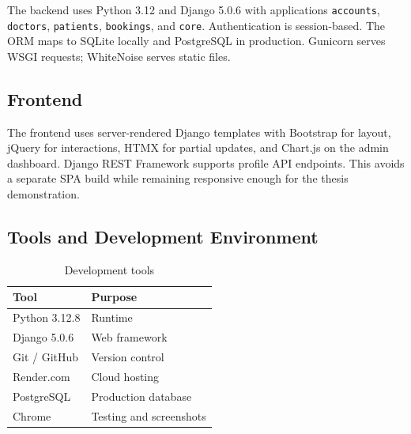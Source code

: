 The backend uses Python 3.12 and Django 5.0.6 with applications \texttt{accounts}, \texttt{doctors}, \texttt{patients}, \texttt{bookings}, and \texttt{core}. Authentication is session-based. The ORM maps to SQLite locally and PostgreSQL in production. Gunicorn serves WSGI requests; WhiteNoise serves static files.

\subsection{Frontend}

The frontend uses server-rendered Django templates with Bootstrap for layout, jQuery for interactions, HTMX for partial updates, and Chart.js on the admin dashboard. Django REST Framework supports profile API endpoints. This avoids a separate SPA build while remaining responsive enough for the thesis demonstration.

\subsection{Tools and Development Environment}

\begin{table}[htbp]
  \centering
  \caption{Development tools}
  \begin{tabular}{@{}ll@{}}
    \toprule
    Tool & Purpose \\
    \midrule
    Python 3.12.8 & Runtime \\
    Django 5.0.6 & Web framework \\
    Git / GitHub & Version control \\
    Render.com & Cloud hosting \\
    PostgreSQL & Production database \\
    Chrome & Testing and screenshots \\
    \bottomrule
  \end{tabular}
\end{table}
